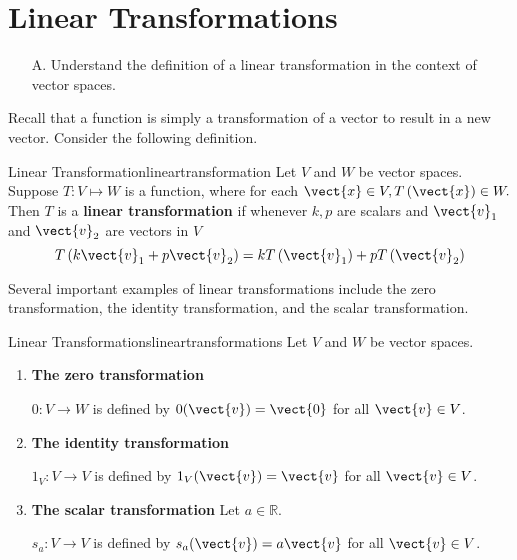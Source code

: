 \section{Linear Transformations}

\begin{outcome}
\begin{enumerate}
\item[A.] Understand the definition of a linear transformation in the context of vector spaces. 
\end{enumerate}
\end{outcome}

Recall that a function is simply a transformation of a vector to result in a new vector. Consider the following definition. 

\begin{definition}{Linear Transformation}{lineartransformation}
 Let $V$ and $W$ be vector spaces. Suppose $T: V \mapsto W$ is a function, where for each
$\vect{x} \in V ,T\left(\vect{x}\right)\in W.$ Then $T$ is a
 \textbf{linear transformation}
if whenever $k ,p $ are scalars and 
$\vect{v}_1$ and $\vect{v}_2$ are vectors in $V$
\begin{equation*}
T\left( k \vect{v}_1 + p \vect{v}_2 \right) = kT\left(\vect{v}_1\right)+ pT\left(\vect{v}_{2} \right)
\end{equation*}
\end{definition}

Several important examples of linear transformations include the zero transformation, the identity transformation, and the scalar transformation. 

\begin{example}{Linear Transformations}{lineartransformations}
Let $V$ and $W$ be vector spaces.

\begin{enumerate}
\item \textbf{The zero transformation} 

$0:V\to W$ is defined by $0(\vect{v})=\vect{0}$ for all $\vect{v}\in V$.


\item \textbf{The identity transformation} 

$1_V:V\to V$ is defined by $1_V(\vect{v})=\vect{v}$ for all $\vect{v}\in V$.

\item \textbf{The scalar transformation} 
Let $a\in\mathbb{R}$.

$s_a:V\to V$ is defined by $s_a(\vect{v})=a\vect{v}$ for all $\vect{v}\in V$.
\end{enumerate}
\end{example}


